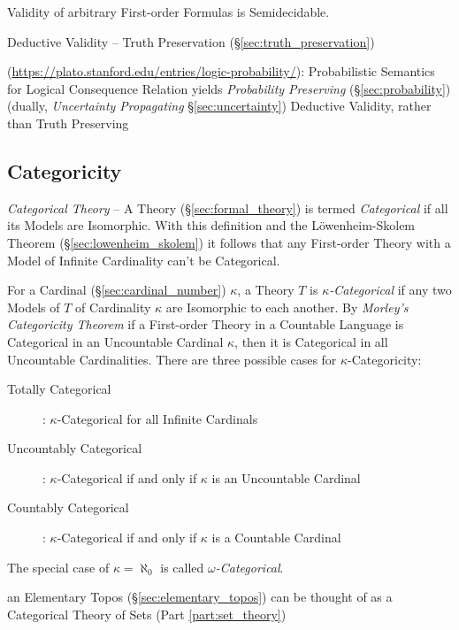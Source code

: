 Validity of arbitrary First-order Formulas is Semidecidable.

Deductive Validity -- Truth Preservation (\S\ref{sec:truth_preservation})

(\url{https://plato.stanford.edu/entries/logic-probability/}): Probabilistic
Semantics for Logical Consequence Relation yields \emph{Probability Preserving}
(\S\ref{sec:probability}) (dually, \emph{Uncertainty Propagating}
\S\ref{sec:uncertainty}) Deductive Validity, rather than Truth Preserving



\subsection{Categoricity}\label{sec:categoricity}

\emph{Categorical Theory} -- A Theory (\S\ref{sec:formal_theory}) is termed
\emph{Categorical} if all its Models are Isomorphic. With this definition and
the L\"owenheim-Skolem Theorem (\S\ref{sec:lowenheim_skolem}) it follows that
any First-order Theory with a Model of Infinite Cardinality can't be
Categorical.

For a Cardinal (\S\ref{sec:cardinal_number}) $\kappa$, a Theory $T$ is
\emph{$\kappa$-Categorical} if any two Models of $T$ of Cardinality
$\kappa$ are Isomorphic to each another. By \emph{Morley's
  Categoricity Theorem}\cite{morley65} if a First-order Theory in a
Countable Language is Categorical in an Uncountable Cardinal $\kappa$,
then it is Categorical in all Uncountable Cardinalities. There are
three possible cases for $\kappa$-Categoricity:
\begin{description}
\item[Totally Categorical]: $\kappa$-Categorical for all Infinite
  Cardinals
\item[Uncountably Categorical]: $\kappa$-Categorical if and only if
  $\kappa$ is an Uncountable Cardinal
\item[Countably Categorical]: $\kappa$-Categorical if and only if
  $\kappa$ is a Countable Cardinal
\end{description}
The special case of $\kappa = \aleph_0$ is called
\emph{$\omega$-Categorical}.

an Elementary Topos (\S\ref{sec:elementary_topos}) can be thought of as a
Categorical Theory of Sets (Part \ref{part:set_theory})



